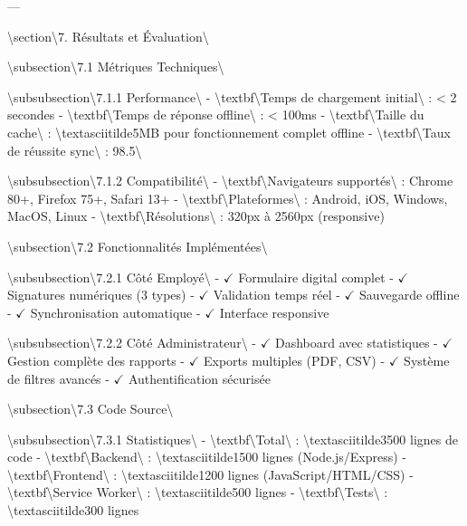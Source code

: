 \documentclass[12pt,a4paper]{report}
\begin{document}
---

\textbackslash{}section\textbackslash{}{7. Résultats et Évaluation\textbackslash{}}

\textbackslash{}subsection\textbackslash{}{7.1 Métriques Techniques\textbackslash{}}

\textbackslash{}subsubsection\textbackslash{}{7.1.1 Performance\textbackslash{}}
- \textbackslash{}textbf\textbackslash{}{Temps de chargement initial\textbackslash{}} : < 2 secondes
- \textbackslash{}textbf\textbackslash{}{Temps de réponse offline\textbackslash{}} : < 100ms
- \textbackslash{}textbf\textbackslash{}{Taille du cache\textbackslash{}} : \textbackslash{}textasciitilde{}5MB pour fonctionnement complet offline
- \textbackslash{}textbf\textbackslash{}{Taux de réussite sync\textbackslash{}} : 98.5\textbackslash{}%

\textbackslash{}subsubsection\textbackslash{}{7.1.2 Compatibilité\textbackslash{}}
- \textbackslash{}textbf\textbackslash{}{Navigateurs supportés\textbackslash{}} : Chrome 80+, Firefox 75+, Safari 13+
- \textbackslash{}textbf\textbackslash{}{Plateformes\textbackslash{}} : Android, iOS, Windows, MacOS, Linux
- \textbackslash{}textbf\textbackslash{}{Résolutions\textbackslash{}} : 320px à 2560px (responsive)

\textbackslash{}subsection\textbackslash{}{7.2 Fonctionnalités Implémentées\textbackslash{}}

\textbackslash{}subsubsection\textbackslash{}{7.2.1 Côté Employé\textbackslash{}}
- $\checkmark$ Formulaire digital complet
- $\checkmark$ Signatures numériques (3 types)
- $\checkmark$ Validation temps réel
- $\checkmark$ Sauvegarde offline
- $\checkmark$ Synchronisation automatique
- $\checkmark$ Interface responsive

\textbackslash{}subsubsection\textbackslash{}{7.2.2 Côté Administrateur\textbackslash{}}
- $\checkmark$ Dashboard avec statistiques
- $\checkmark$ Gestion complète des rapports
- $\checkmark$ Exports multiples (PDF, CSV)
- $\checkmark$ Système de filtres avancés
- $\checkmark$ Authentification sécurisée

\textbackslash{}subsection\textbackslash{}{7.3 Code Source\textbackslash{}}

\textbackslash{}subsubsection\textbackslash{}{7.3.1 Statistiques\textbackslash{}}
- \textbackslash{}textbf\textbackslash{}{Total\textbackslash{}} : \textbackslash{}textasciitilde{}3500 lignes de code
- \textbackslash{}textbf\textbackslash{}{Backend\textbackslash{}} : \textbackslash{}textasciitilde{}1500 lignes (Node.js/Express)
- \textbackslash{}textbf\textbackslash{}{Frontend\textbackslash{}} : \textbackslash{}textasciitilde{}1200 lignes (JavaScript/HTML/CSS)
- \textbackslash{}textbf\textbackslash{}{Service Worker\textbackslash{}} : \textbackslash{}textasciitilde{}500 lignes
- \textbackslash{}textbf\textbackslash{}{Tests\textbackslash{}} : \textbackslash{}textasciitilde{}300 lignes
\end{document}
